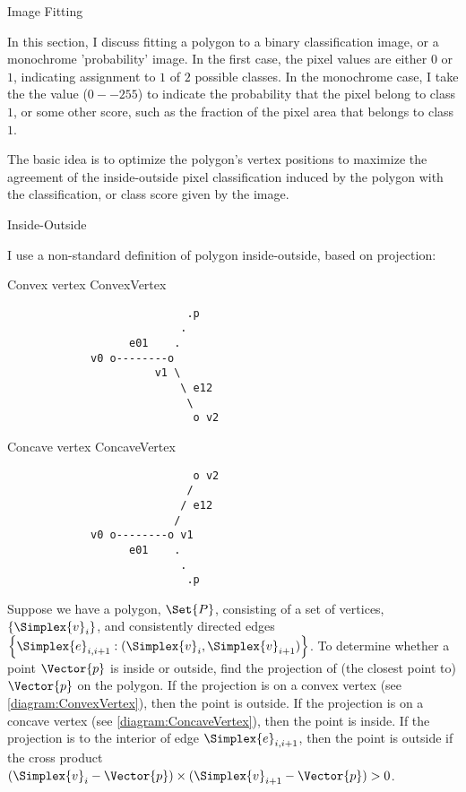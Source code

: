 \begin{plSection}{Image Fitting}
\label{sec:image-fitting}

In this section, I discuss fitting a polygon to a binary classification
image, or a monochrome 'probability' image.
In the first case, the pixel values are either $0$ or $1$,
indicating assignment to $1$ of $2$ possible classes.
In the monochrome case, I take the the value ($0--255$) to indicate
the probability that the pixel belong to class $1$,
or some other score, such as the fraction of the pixel area that belongs
to class $1$.

The basic idea is to optimize the polygon's vertex positions
to maximize the agreement of the inside-outside pixel classification
induced by the polygon with the classification, or class score
given by the image.

\begin{plSection}{Inside-Outside}
\label{sec:inside-outside}

I use a non-standard definition of polygon inside-outside,
based on projection:

\begin{plDiagram}
{Convex vertex}
{ConvexVertex}
\centering
\begin{verbatim}
                            .p
                           .
                   e01    .
             v0 o--------o
                       v1 \
                           \ e12
                            \
                             o v2
\end{verbatim}
\end{plDiagram}

\begin{plDiagram}
{Concave vertex}
{ConcaveVertex}
\centering
\begin{verbatim}
                             o v2
                            /
                           / e12
                          /
             v0 o--------o v1
                   e01    .
                           .
                            .p
\end{verbatim}
\end{plDiagram}

Suppose we have a polygon, $\Set{P}$, consisting of a set of vertices,
$\left\{\Simplex{v}_i\right\}$, and consistently directed edges $\left\{\Simplex{e}_{i,i+1}:(\Simplex{v}_i,\Simplex{v}_{i+1})\right\}$.
To determine whether a point $\Vector{p}$ is inside or outside,
find the projection of (the closest point to) $\Vector{p}$ on the polygon.
If the projection is on a convex vertex (see \ref{diagram:ConvexVertex}),
then the point is outside.
If the projection is on a concave vertex (see \ref{diagram:ConcaveVertex}),
then the point is inside.
If the projection is to the interior of edge $\Simplex{e}_{i,i+1}$,
then the point is outside if the cross product
$(\Simplex{v}_i-\Vector{p}) \times (\Simplex{v}_{i+1}-\Vector{p}) > 0$.


\end{plSection}
\end{plSection}
